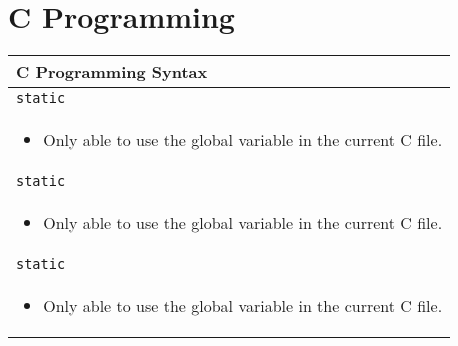 \documentclass[twoside]{article}
\begin{document}
\section{C Programming}
\begin{summary}
    \begin{center}
        \begin{tabular}{l}
        \toprule
        \textbf{C Programming Syntax} \\
        \midrule
        \texttt{static} \\
        \multicolumn{1}{p{\linewidth}}{
        \begin{itemize}
            \item Only able to use the global variable in the current C file.
        \end{itemize}} \\
        \midrule
        \texttt{static} \\
        \multicolumn{1}{p{\linewidth}}{
        \begin{itemize}
            \item Only able to use the global variable in the current C file.
        \end{itemize}} \\
        \midrule
        \texttt{static} \\
        \multicolumn{1}{p{\linewidth}}{
        \begin{itemize}
            \item Only able to use the global variable in the current C file.
        \end{itemize}} \\
        \midrule
        \bottomrule
        \end{tabular}
    \end{center}
\end{summary}
\newpage
\end{document}
